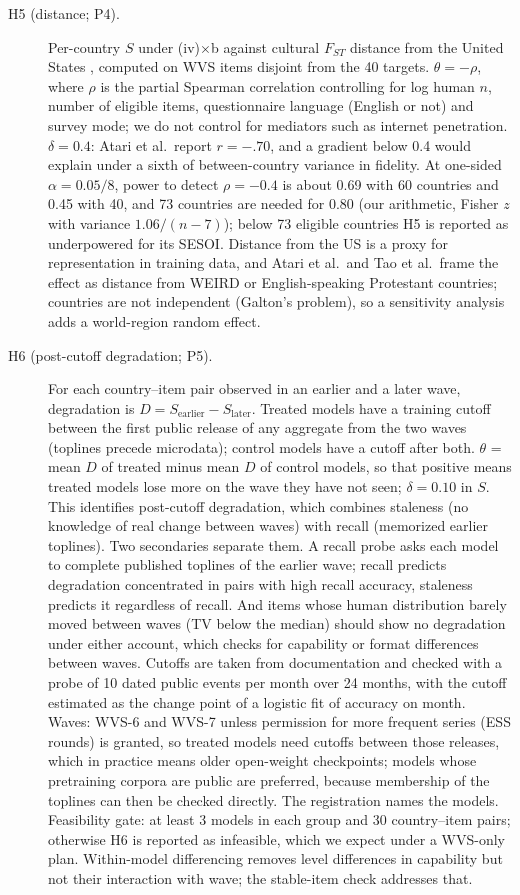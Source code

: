 \documentclass[11pt]{article}
\begin{document}
\begin{description}
  \item[H5 (distance; P4).] Per-country $S$ under (iv)$\times$b against cultural $F_{ST}$ distance from the United States \citep{muthukrishna2020}, computed on WVS items disjoint from the 40 targets. $\theta = -\rho$, where $\rho$ is the partial Spearman correlation controlling for log human $n$, number of eligible items, questionnaire language (English or not) and survey mode; we do not control for mediators such as internet penetration. $\delta = 0.4$: Atari et al.\ report $r=-.70$, and a gradient below 0.4 would explain under a sixth of between-country variance in fidelity. At one-sided $\alpha = 0.05/8$, power to detect $\rho = -0.4$ is about 0.69 with 60 countries and 0.45 with 40, and 73 countries are needed for 0.80 (our arithmetic, Fisher $z$ with variance $1.06/(n-7)$); below 73 eligible countries H5 is reported as underpowered for its SESOI. Distance from the US is a proxy for representation in training data, and Atari et al.\ and Tao et al.\ frame the effect as distance from WEIRD or English-speaking Protestant countries; countries are not independent (Galton's problem), so a sensitivity analysis adds a world-region random effect.
  \item[H6 (post-cutoff degradation; P5).] For each country--item pair observed in an earlier and a later wave, degradation is $D = S_{\text{earlier}} - S_{\text{later}}$. Treated models have a training cutoff between the first public release of any aggregate from the two waves (toplines precede microdata); control models have a cutoff after both. $\theta$ = mean $D$ of treated minus mean $D$ of control models, so that positive means treated models lose more on the wave they have not seen; $\delta = 0.10$ in $S$. This identifies post-cutoff degradation, which combines staleness (no knowledge of real change between waves) with recall (memorized earlier toplines). Two secondaries separate them. A recall probe asks each model to complete published toplines of the earlier wave; recall predicts degradation concentrated in pairs with high recall accuracy, staleness predicts it regardless of recall. And items whose human distribution barely moved between waves (TV below the median) should show no degradation under either account, which checks for capability or format differences between waves. Cutoffs are taken from documentation and checked with a probe of 10 dated public events per month over 24 months, with the cutoff estimated as the change point of a logistic fit of accuracy on month. Waves: WVS-6 and WVS-7 unless permission for more frequent series (ESS rounds) is granted, so treated models need cutoffs between those releases, which in practice means older open-weight checkpoints; models whose pretraining corpora are public are preferred, because membership of the toplines can then be checked directly. The registration names the models. Feasibility gate: at least 3 models in each group and 30 country--item pairs; otherwise H6 is reported as infeasible, which we expect under a WVS-only plan. Within-model differencing removes level differences in capability but not their interaction with wave; the stable-item check addresses that.

\end{description}
\end{document}
